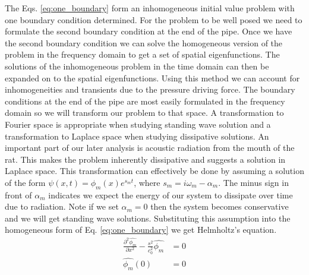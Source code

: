 \documentclass[12pt, letter]{report}
\begin{document}
The Eqs. \ref{eq:one_boundary} form an inhomogeneous initial value problem with one boundary condition determined. For the problem to be well posed we need to formulate the second boundary condition at the end of the pipe. Once we have the second boundary condition we can solve the homogeneous version of the problem in the frequency domain to get a set of spatial eigenfunctions. The solutions of the inhomogeneous problem in the time domain can then be expanded on to the spatial eigenfunctions. Using this method we can account for inhomogeneities and transients due to the pressure driving force. The boundary conditions at the end of the pipe are most easily formulated in the frequency domain so we will transform our problem to that space. A transformation to Fourier space is appropriate when studying standing wave solution and a transformation to Laplace space when studying dissipative solutions. An important part of our later analysis is acoustic radiation from the mouth of the rat. This makes the problem inherently dissipative and suggests a solution in Laplace space. This transformation can effectively be done by assuming a solution of the form $\psi(x,t)=\phi_m(x) e^{s_m t}$, where $s_m = i\omega_m - \alpha_m$. The minus sign in front of $\alpha_m$ indicates we expect the energy of our system to dissipate over time due to radiation. Note if we set $\alpha_m=0$ then the system becomes conservative and we will get standing wave solutions. Substituting this assumption into the homogeneous form of Eq. \ref{eq:one_boundary} we get Helmholtz's equation.
\begin{equation}
\label{eq:helmholtz}
\begin{split}
\frac{\partial^2 \hat{\phi_m}}{\partial x^2} - \frac{s^2}{c_0^2} \hat{\phi_m} &= 0 \\
\hat{\phi_m}(0) &= 0
\end{split}
\end{equation}
\end{document}
